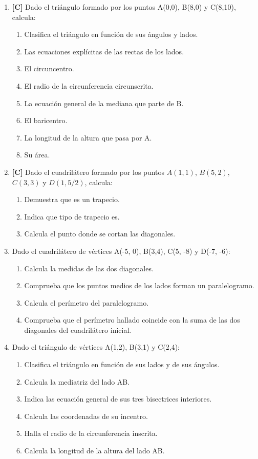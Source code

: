 \begin{enumerate}[topsep=0pt]
	\item \textbf{[C]}  Dado el triángulo formado por los puntos A(0,0), B(8,0) y C(8,10), calcula:
		\begin{enumerate}[topsep=0pt, label=\arabic*)]
			\item Clasifica el triángulo en función de sus ángulos y lados.
			\item Las ecuaciones explícitas de las rectas de los lados.
			\item El circuncentro.
			\item El radio de la circunferencia circunscrita.
			\item La ecuación general de la mediana que parte de B.
			\item El baricentro.
			\item La longitud de la altura que pasa por A.
			\item Su área.
		\end{enumerate}
	
	\item \textbf{[C]} Dado el cuadrilátero formado por los puntos $A(1,1)$, $B(5,2)$, $C(3,3)$ y $D(1, 5/2)$, calcula:
		\begin{enumerate}[topsep=0pt, label=\arabic*)]
			\item Demuestra que es un trapecio.
			\item Indica que tipo de trapecio es.
			\item Calcula el punto donde se cortan las diagonales.
		\end{enumerate}
	
	\item Dado el cuadrilátero de vértices A(-5, 0), B(3,4), C(5, -8) y D(-7, -6):
		\begin{enumerate}[topsep=0pt, label=\arabic*)]
			\item Calcula la medidas de las dos diagonales.
			\item Comprueba que los puntos medios de los lados forman un paralelogramo.
			\item Calcula el perímetro del paralelogramo.
			\item Comprueba que el perímetro hallado coincide con la suma de las dos diagonales del cuadrilátero inicial.
		\end{enumerate}
	
	\item Dado el triángulo de vértices A(1,2), B(3,1) y C(2,4):
		\begin{enumerate}[topsep=0pt, label=\arabic*)]
			\item Clasifica el triángulo en función de sus lados y de sus ángulos.
			\item Calcula la mediatriz del lado AB.
			\item Indica las ecuación general de sus tres bisectrices interiores.
			\item Calcula las coordenadas de su incentro.
			\item Halla el radio de la circunferencia inscrita.
			\item Calcula la longitud de la altura del lado AB.
		\end{enumerate}
	

\end{enumerate}
